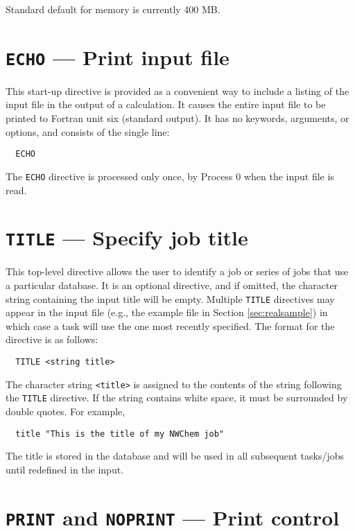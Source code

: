 Standard default for memory is currently 400 MB.

\section{{\tt ECHO} --- Print input file}
\label{sec:echo}

This start-up directive is provided as a convenient way to include a
listing of the input file in the output of a calculation.  It causes
the entire input file to be printed to Fortran unit six (standard
output).  It has no keywords, arguments, or options, and consists of
the single line:

\begin{verbatim}
  ECHO
\end{verbatim}

The \verb+ECHO+ directive is processed only
once, by Process 0 when the input file is read.

\section{{\tt TITLE} --- Specify job title}

This top-level directive allows the user to identify a job or series
of jobs that use a particular database.  It is an optional directive,
and if omitted, the character string containing the input title will
be empty.  Multiple {\tt TITLE} directives may appear in the input
file (e.g., the example file in Section \ref{sec:realsample}) in which
case a task will use the one most recently specified.  The format for
the directive is as follows:

\begin{verbatim}
  TITLE <string title>
\end{verbatim}

The character string \verb+<title>+ is assigned to the contents of the
string following the \verb+TITLE+ directive.  If the string contains
white space, it must be surrounded by double quotes.  For example,

\begin{verbatim}
  title "This is the title of my NWChem job"
\end{verbatim}

The title is stored in the database and will be used in all subsequent
tasks/jobs until redefined in the input.

\section{{\tt PRINT} and {\tt NOPRINT} --- Print control}
\label{sec:printcontrol}

